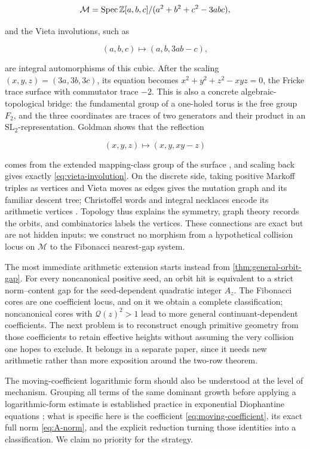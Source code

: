 \begin{equation}
 \mathcal M
 =\operatorname{Spec}
 \mathbb{Z}[a,b,c]/(a^2+b^2+c^2-3abc),
 \label{eq:markoff-scheme}
\end{equation}

and the Vieta involutions, such as

\begin{equation}
 (a,b,c)\longmapsto(a,b,3ab-c),
 \label{eq:vieta-involution}
\end{equation}

are integral automorphisms of this cubic. After the scaling
$(x,y,z)=(3a,3b,3c)$, its equation becomes
$x^2+y^2+z^2-xyz=0$, the Fricke trace surface with commutator trace $-2$.
This is also a concrete algebraic-topological bridge: the fundamental group
of a one-holed torus is the free group $F_2$, and the three coordinates are
traces of two generators and their product in an
$\mathrm{SL}_2$-representation. Goldman shows that the reflection

\[
 (x,y,z)\longmapsto(x,y,xy-z)
\]

comes from the extended mapping-class group of the surface
\cite[Sections~2.1--2.2 and Appendix~A-3]{Goldman2003}, and scaling back
gives exactly \cref{eq:vieta-involution}. On the discrete side, taking
positive Markoff triples as vertices and Vieta moves as edges gives the
mutation graph and its familiar descent tree; Christoffel words and integral
necklaces encode its arithmetic vertices
\cite{Reutenauer2026,Fisac2025}. Topology thus explains the symmetry, graph
theory records the orbits, and combinatorics labels the vertices. These
connections are exact but are not hidden inputs: we construct no morphism
from a hypothetical collision locus on $\mathcal M$ to the Fibonacci
nearest-gap system.

The most immediate arithmetic extension starts instead from
\cref{thm:general-orbit-gap}. For every noncanonical positive seed, an orbit
hit is equivalent to a strict norm--content gap for the seed-dependent
quadratic integer $A_z$. The Fibonacci cores are one coefficient locus, and
on it we obtain a complete classification; noncanonical cores with
$\mathcal Q(z)^2>1$ lead to more general continuant-dependent coefficients.
The next problem is to reconstruct enough primitive geometry from those
coefficients to retain effective heights without assuming the very collision
one hopes to exclude. It belongs in a separate paper, since it needs new
arithmetic rather than more exposition around the two-row theorem.

The moving-coefficient logarithmic form should also be understood at the
level of mechanism. Grouping all terms of the same dominant growth before
applying a logarithmic-form estimate is established practice in exponential
Diophantine equations
\cite{DdamuliraLucaRakotomalala2016,BravoDasHerreraSaunders2026}; what is
specific here is the coefficient \cref{eq:moving-coefficient}, its exact
full norm \cref{eq:A-norm}, and the explicit reduction turning those
identities into a classification. We claim no priority for the strategy.

